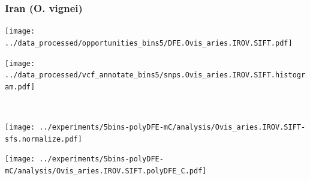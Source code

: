 \subsubsection{Iran (O. vignei)}

\begin{minipage}{0.49\linewidth}
    \texttt{[image: ../data\_processed/opportunities\_bins5/DFE.Ovis\_aries.IROV.SIFT.pdf]}
\end{minipage}
\begin{minipage}{0.49\linewidth}
    \texttt{[image: ../data\_processed/vcf\_annotate\_bins5/snps.Ovis\_aries.IROV.SIFT.histogram.pdf]}
\end{minipage}
\\
\begin{minipage}{0.49\linewidth}
    \texttt{[image: ../experiments/5bins-polyDFE-mC/analysis/Ovis\_aries.IROV.SIFT-sfs.normalize.pdf]}
\end{minipage}
\begin{minipage}{0.4\linewidth}
    \texttt{[image: ../experiments/5bins-polyDFE-mC/analysis/Ovis\_aries.IROV.SIFT.polyDFE\_C.pdf]}
\end{minipage}
